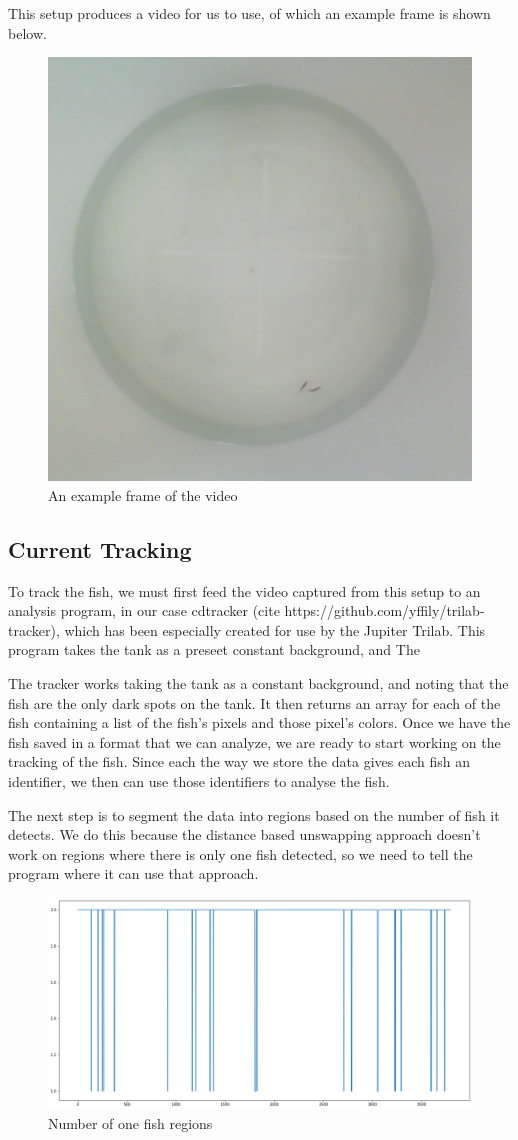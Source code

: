 \documentclass{article}
\begin{document}
This setup produces a video for us to use, of which an example frame is shown below.

\begin{figure}[H]
	\centering
	\includegraphics[width=.5\linewidth]{figures.frame5140}
	\caption{An example frame of the video}
\end{figure}

\subsection{Current Tracking}

To track the fish, we must first feed the video captured from this setup to an analysis program, in our case cdtracker (cite https://github.com/yffily/trilab-tracker), which has been especially created for use by the Jupiter Trilab. This program takes the tank as a preseet constant background, and The

The tracker works taking the tank as a constant background, and noting that the fish are the only dark spots on the tank. It then returns an array for each of the fish containing a list of the fish's pixels and those pixel's colors. Once we have the fish saved in a format that we can analyze, we are ready to start working on the tracking of the fish. Since each the way we store the data gives each fish an identifier, we then can use those identifiers to analyse the fish.

The next step is to segment the data into regions based on the number of fish it detects. We do this because the distance based unswapping approach doesn't work on regions where there is only one fish detected, so we need to tell the program where it can use that approach.

\begin{figure}[H]
	\centering
	\includegraphics[width=.75\linewidth]{oneFish}
	\caption{Number of one fish regions}
\end{figure}
\end{document}
